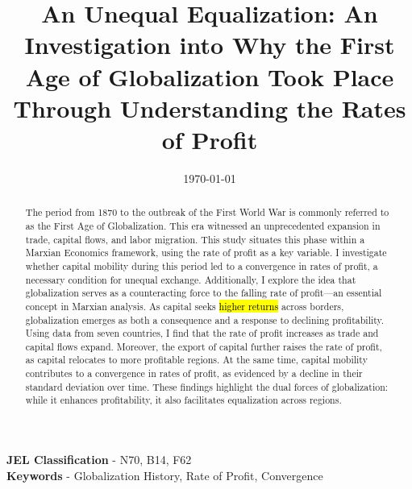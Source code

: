 \documentclass[10pt]{article}
\begin{document}
\title{\textcolor{blue!60!black}{An Unequal Equalization: An Investigation into Why the First Age of Globalization Took Place Through Understanding the Rates of Profit}}
\date{\today}
\maketitle 
\begin{abstract} 
The period from 1870 to the outbreak of the First World War is commonly referred to as the First Age of Globalization. This era witnessed an unprecedented expansion in trade, capital flows, and labor migration. This study situates this phase within a Marxian Economics framework, using the rate of profit as a key variable. I investigate whether capital mobility during this period led to a convergence in rates of profit, a necessary condition for unequal exchange. Additionally, I explore the idea that globalization serves as a counteracting force to the falling rate of profit—an essential concept in Marxian analysis. As capital seeks \hl{higher returns} across borders, globalization emerges as both a consequence and a response to declining profitability. Using data from seven countries, I find that the rate of profit increases as trade and capital flows expand. Moreover, the export of capital further raises the rate of profit, as capital relocates to more profitable regions. At the same time, capital mobility contributes to a convergence in rates of profit, as evidenced by a decline in their standard deviation over time. These findings highlight the dual forces of globalization: while it enhances profitability, it also facilitates equalization across regions.
\end{abstract}    
\textbf{JEL Classification} - N70, B14, F62 \\
\textbf{Keywords} - Globalization History, Rate of Profit, Convergence
\end{document}
